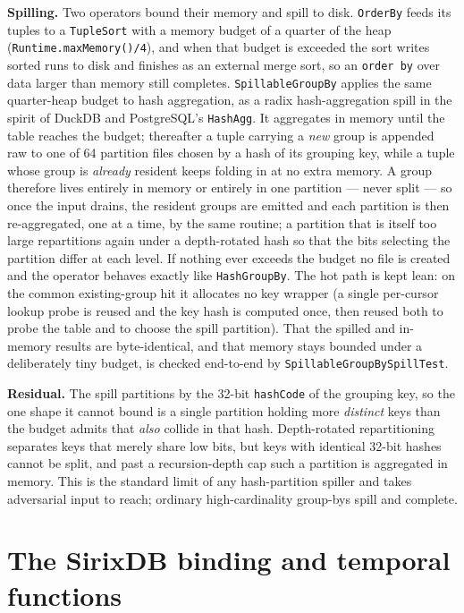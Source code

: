 \documentclass[11pt,a4paper,oneside]{report}
\theoremstyle{sirixthm}
\newcommand{\code}[1]{\texttt{#1}}
\begin{document}
\textbf{Spilling.} Two operators bound their memory and spill to disk. \code{OrderBy} feeds its tuples to
a \code{TupleSort} with a memory budget of a quarter of the heap (\code{Runtime.maxMemory()/4}), and when
that budget is exceeded the sort writes sorted runs to disk and finishes as an external merge sort, so an
\code{order by} over data larger than memory still completes. \code{SpillableGroupBy} applies the same
quarter-heap budget to hash aggregation, as a radix hash-aggregation spill in the spirit of DuckDB and
PostgreSQL's \code{HashAgg}. It aggregates in memory until the table reaches the budget; thereafter a
tuple carrying a \emph{new} group is appended raw to one of 64 partition files chosen by a hash of its
grouping key, while a tuple whose group is \emph{already} resident keeps folding in at no extra memory.
A group therefore lives entirely in memory or entirely in one partition --- never split --- so once the
input drains, the resident groups are emitted and each partition is then re-aggregated, one at a time, by
the same routine; a partition that is itself too large repartitions again under a depth-rotated hash so
that the bits selecting the partition differ at each level. If nothing ever exceeds the budget no file is
created and the operator behaves exactly like \code{HashGroupBy}. The hot path is kept lean: on the common
existing-group hit it allocates no key wrapper (a single per-cursor lookup probe is reused and the key
hash is computed once, then reused both to probe the table and to choose the spill partition). That the
spilled and in-memory results are byte-identical, and that memory stays bounded under a deliberately tiny
budget, is checked end-to-end by \code{SpillableGroupBySpillTest}.

\begin{honesty}
\small\textbf{Residual.} The spill partitions by the 32-bit \code{hashCode} of the grouping key, so the
one shape it cannot bound is a single partition holding more \emph{distinct} keys than the budget admits
that \emph{also} collide in that hash. Depth-rotated repartitioning separates keys that merely share low
bits, but keys with identical 32-bit hashes cannot be split, and past a recursion-depth cap such a
partition is aggregated in memory. This is the standard limit of any hash-partition spiller and takes
adversarial input to reach; ordinary high-cardinality group-bys spill and complete.
\end{honesty}

\section{The SirixDB binding and temporal functions}
\end{document}
